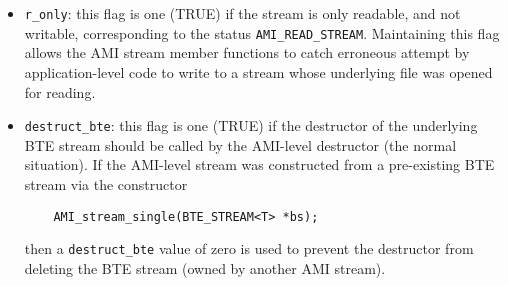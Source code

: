 \begin{itemize}
\begin{enumerate}
    \begin{itemize}
    \item \lstinline|r_only|: this flag is one (TRUE) if the stream is
      only readable, and not writable, corresponding to the status
      \lstinline|AMI_READ_STREAM|. Maintaining this flag allows the
      AMI stream member functions to catch erroneous attempt by
      application-level code to write to a stream whose underlying
      file was opened for reading.
            
    \item \lstinline|destruct_bte|: this flag is one (TRUE) if the
      destructor of the underlying BTE stream should be called by the
      AMI-level destructor (the normal situation). If the AMI-level
      stream was constructed from a pre-existing BTE stream via the
      constructor
\begin{lstlisting}
    AMI_stream_single(BTE_STREAM<T> *bs);
\end{lstlisting}
      then a \lstinline|destruct_bte| value of zero is used
      to prevent the destructor from deleting the BTE
      stream (owned by another AMI stream).
    \end{itemize}
  \end{enumerate}
  
\end{itemize}



